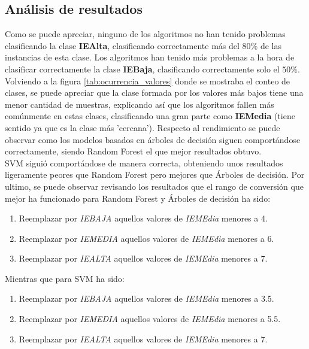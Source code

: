 \subsection{Análisis de resultados}
Como se puede apreciar, ninguno de los algoritmos no han tenido problemas clasificando la clase \textbf{IEAlta}, clasificando correctamente más del $80\%$ de las instancias de esta clase.
Los algoritmos han tenido más problemas a la hora de clasificar correctamente la clase \textbf{IEBaja}, clasificando correctamente solo el $50\%$. Volviendo a la figura \ref{tab:ocurrencia_valores} donde se mostraba el conteo de clases, se puede apreciar que la clase formada por los valores más bajos tiene una menor cantidad de muestras, explicando así que los algoritmos fallen más comúnmente en estas clases, clasificando una gran parte como \textbf{IEMedia} (tiene sentido ya que es la clase más 'cercana').
\linebreak
Respecto al rendimiento se puede observar como los modelos basados en árboles de decisión siguen comportándose correctamente, siendo Random Forest el que mejor resultados obtuvo. \\
SVM siguió comportándose de manera correcta, obteniendo unos resultados ligeramente peores que Random Forest pero mejores que Árboles de decisión.
\linebreak
Por ultimo, se puede observar revisando los resultados que el rango de conversión que mejor ha funcionado para Random Forest y Árboles de decisión ha sido:
\begin{enumerate}
	\item Reemplazar por \textit{IEBAJA} aquellos valores de \textit{IEMEdia} menores a 4.
	\item Reemplazar por \textit{IEMEDIA} aquellos valores de \textit{IEMEdia} menores a 6.
	\item Reemplazar por \textit{IEALTA} aquellos valores de \textit{IEMEdia} menores a 7.
\end{enumerate}
Mientras que para SVM ha sido:
\begin{enumerate}
	\item Reemplazar por \textit{IEBAJA} aquellos valores de \textit{IEMEdia} menores a 3.5.
	\item Reemplazar por \textit{IEMEDIA} aquellos valores de \textit{IEMEdia} menores a 5.5.
	\item Reemplazar por \textit{IEALTA} aquellos valores de \textit{IEMEdia} menores a 7.
\end{enumerate}

